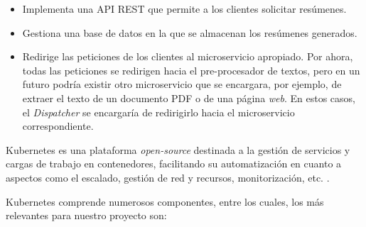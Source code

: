 \vspace{-0.5cm}
\begin{itemize}
	\item [\textbullet] Implementa una API REST que permite a los clientes solicitar resúmenes.
	\item [\textbullet] Gestiona una base de datos en la que se almacenan los resúmenes generados.
	\item [\textbullet] Redirige las peticiones de los clientes al microservicio apropiado. Por ahora, todas las peticiones se redirigen hacia el pre-procesador de textos, pero en un futuro podría existir otro microservicio que se encargara, por ejemplo, de extraer el texto de un documento PDF o de una página \emph{web}. En estos casos, el \emph{Dispatcher} se encargaría de redirigirlo hacia el microservicio correspondiente.
\end{itemize}

Kubernetes es una plataforma \emph{open-source} destinada a la gestión de servicios y cargas de trabajo en contenedores, facilitando su automatización en cuanto a aspectos como el escalado, gestión de red y recursos, monitorización, etc. \cite{kubernetes}.

Kubernetes comprende numerosos componentes, entre los cuales, los más relevantes para nuestro proyecto son:

